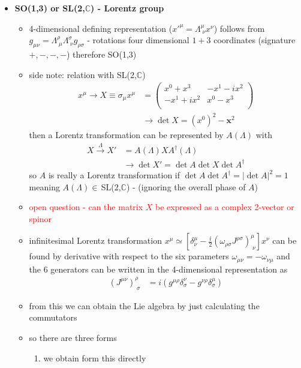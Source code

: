 \documentclass[10pt,a4paper]{report}
\theoremstyle{definition}
\begin{document}
\begin{itemize}
\item {\bf SO(1,3) or  SL(2,$\mathbb{C}$) - Lorentz group}
\begin{itemize}
\item 4-dimensional defining representation ($x'^\mu=\Lambda^\mu_{\;\nu}x^\nu$) follows from $g_{\mu\nu}=\Lambda^\rho_{\;\mu}\Lambda^\sigma_{\;\nu}g_{\rho\sigma}$ - rotations four dimensional $1+3$ coordinates (signature $+,-,-,-$) therefore SO(1,3)
\item side note: relation with SL(2,$\mathbb{C}$)
\begin{align}
x^\mu\rightarrow X\equiv\sigma_\mu x^\mu
&=\left(
\begin{matrix}
x^0+x^3   & -x^1-ix^2\\
-x^1+ix^2 & x^0-x^3\\
\end{matrix}
\right)\\
&\rightarrow\det X=(x^0)^2-\mathbf{x}^2
\end{align}
then a Lorentz transformation can be represented by $A(\Lambda)$ with
\begin{align}
X\overset{\Lambda}{\rightarrow}X'&=A(\Lambda)XA^\dagger(\Lambda)\\
&\rightarrow \det X'=\det A\det X\det A^\dagger
\end{align} 
so $A$ is really a Lorentz transformation if $\det A\det A^\dagger=|\det A|^2=1$ meaning 
$A(\Lambda)\in\,$SL(2,$\mathbb{C}$) - (ignoring the overall phase of $A$)
\item \textcolor{red}{open question - can the matrix $X$ be expressed as a complex 2-vector  or spinor}
\item infinitesimal Lorentz transformation $x^\mu\simeq[\delta^\mu_\nu-\frac{i}{2}(\omega_{\rho\sigma}J^{\rho\sigma})^\mu_{\;\nu}]x^\nu$ can be found by derivative with respect to the six parameters $\omega_{\mu\nu}=-\omega_{\nu\mu}$ and the 6 generators can be written in the 4-dimensional representation as
\begin{align}
(J^{\mu\nu})^\rho_{\;\sigma}
&=i(g^{\mu\rho}\delta^\nu_\sigma-g^{\nu\rho}\delta^\mu_\sigma)
\end{align}
\item from this we can obtain the Lie algebra by just calculating the commutators
\item so there are three forms
\begin{enumerate}
\item we obtain form this directly
\begin{align}
[J^{\mu\nu},J^{\rho\sigma}]

\end{align}
\end{enumerate}
\end{itemize}
\end{itemize}
\end{document}
